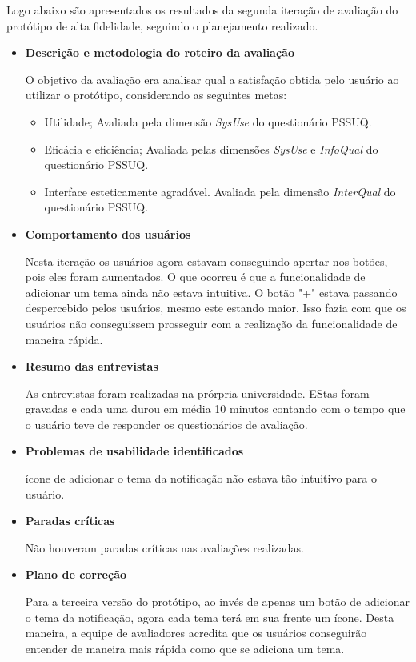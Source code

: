   Logo abaixo são apresentados os resultados da segunda iteração de avaliação do protótipo de alta fidelidade,
  seguindo o planejamento realizado.
  
  \begin{itemize}
    \item \textbf{Descrição e metodologia do roteiro da avaliação}
    
    \subitem O objetivo da avaliação era analisar qual a satisfação obtida pelo usuário ao utilizar o protótipo, 
    considerando as seguintes metas:
    
    \begin{itemize}
      \item Utilidade;
	\subitem Avaliada pela dimensão \textit{SysUse} do questionário PSSUQ.
	
      \item Eficácia e eficiência;
	\subitem Avaliada pelas dimensões \textit{SysUse} e \textit{InfoQual} do questionário PSSUQ.
	
      \item Interface esteticamente agradável.
	\subitem Avaliada pela dimensão \textit{InterQual} do questionário PSSUQ.
    \end{itemize}
    
    \item \textbf{Comportamento dos usuários}
    
    \subitem Nesta iteração os usuários  agora estavam conseguindo apertar nos botões, pois eles foram aumentados. O que ocorreu é 
    que a funcionalidade de adicionar um tema ainda não estava intuitiva. O botão "+" estava passando despercebido pelos 
    usuários, mesmo este estando maior. Isso fazia com que os usuários não conseguissem prosseguir com a realização da
    funcionalidade de maneira rápida.
    
    
    \item \textbf{Resumo das entrevistas}
    
      \subitem As entrevistas foram realizadas na prórpria universidade. EStas foram gravadas e cada uma durou em 
	  média 10 minutos contando com o tempo que o usuário teve de responder os questionários de avaliação.
	    
    \item \textbf{Problemas de usabilidade identificados}
    
      \subitem ícone de adicionar o tema da notificação não estava tão intuitivo para o usuário.
          
    \item \textbf{Paradas críticas}
    
      \subitem Não houveram paradas críticas nas avaliações realizadas.
    
    \item \textbf{Plano de correção}
    
      \subitem Para a terceira versão do protótipo, ao invés de apenas um botão de adicionar o tema da notificação, 
      agora cada tema terá em sua frente um ícone. Desta maneira, a equipe de avaliadores acredita que os usuários 
      conseguirão entender de maneira mais rápida como que se adiciona um tema.
    
  \end{itemize}
